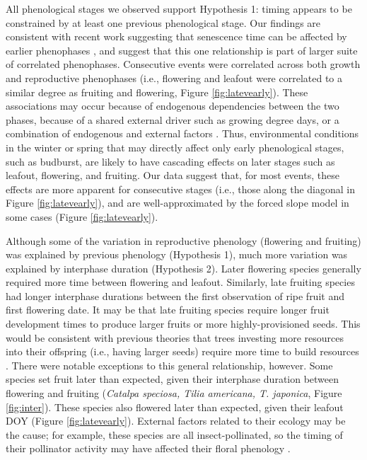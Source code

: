 \documentclass{article}
\begin{document}
\par All phenological stages we observed support Hypothesis 1: timing appears to be constrained by at least one previous phenological stage. Our findings are consistent with recent work suggesting that senescence time can be affected by earlier phenophases \citep{keenan2015,liu2016}, and suggest that this one relationship is part of larger suite of correlated phenophases. Consecutive events were correlated across both growth and reproductive phenophases (i.e., flowering and leafout were correlated to a similar degree as fruiting and flowering, Figure \ref{fig:latevearly}). These associations may occur because of endogenous dependencies between the two phases, because of a shared external driver such as growing degree days, or a combination of endogenous and external factors \citep{lechowicz1995}. Thus, environmental conditions in the winter or spring that may directly affect only early phenological stages, such as budburst, are likely to have cascading effects on later stages such as leafout, flowering, and fruiting. Our data suggest that, for most events, these effects are more apparent for consecutive stages (i.e., those along the diagonal in Figure \ref{fig:latevearly}), and are well-approximated by the forced slope model in some cases (Figure \ref{fig:latevearly}).

\par Although some of the variation in reproductive phenology (flowering and fruiting) was explained by previous phenology (Hypothesis 1), much more variation was explained by interphase duration (Hypothesis 2). Later flowering species generally required more time between flowering and leafout. Similarly, late fruiting species had longer interphase durations between the first observation of ripe fruit and first flowering date. It may be that late fruiting species require longer fruit development times to produce larger fruits or more highly-provisioned seeds. This would be consistent with previous theories that trees investing more resources into their offspring (i.e., having larger seeds) require more time to build resources \citep{bolmgren2008,sun2011}. There were notable exceptions to this general relationship, however. Some species set fruit later than expected, given their interphase duration between flowering and fruiting (\textit{Catalpa speciosa, Tilia americana, T. japonica}, Figure \ref{fig:inter}). These species also flowered later than expected, given their leafout DOY (Figure \ref{fig:latevearly}). External factors related to their ecology may be the cause; for example, these species are all insect-pollinated, so the timing of their pollinator activity may have affected their floral phenology \citep{elzinga2007}. %
\end{document}
